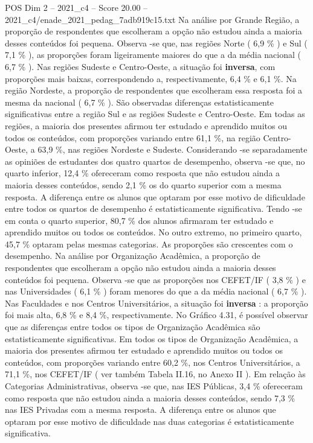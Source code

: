 \begin{textsample}{POS Dim 2 – 2021\_c4 – Score 20.00 – 2021\_c4/enade\_2021\_pedag\_7adb919c15.txt}
Na análise por Grande Região, a proporção de respondentes que escolheram a opção não estudou ainda a maioria desses conteúdos foi pequena.
Observa -se que, nas regiões Norte ( 6,9 \% ) e Sul ( 7,1 \% ), as proporções foram ligeiramente maiores do que a da média nacional ( 6,7 \% ).
Nas regiões Sudeste e Centro-Oeste, a situação foi \textbf{inversa}, com proporções mais baixas, correspondendo a, respectivamente, 6,4 \% e 6,1 \%.
Na região Nordeste, a proporção de respondentes que escolheram essa resposta foi a mesma da nacional ( 6,7 \% ).
São observadas diferenças estatisticamente significativas entre a região Sul e as regiões Sudeste e Centro-Oeste.
Em todas as regiões, a maioria dos presentes afirmou ter estudado e aprendido muitos ou todos os conteúdos, com proporções variando entre 61,1 \%, na região Centro-Oeste, a 63,9 \%, nas regiões Nordeste e Sudeste.
Considerando -se separadamente as opiniões de estudantes dos quatro quartos de desempenho, observa -se que, no quarto inferior, 12,4 \% ofereceram como resposta que não estudou ainda a maioria desses conteúdos, sendo 2,1 \% os do quarto superior com a mesma resposta.
A diferença entre os alunos que optaram por esse motivo de dificuldade entre todos os quartos de desempenho é estatisticamente significativa.
Tendo -se em conta o quarto superior, 80,7 \% dos alunos afirmaram ter estudado e aprendido muitos ou todos os conteúdos.
No outro extremo, no primeiro quarto, 45,7 \% optaram pelas mesmas categorias.
As proporções são crescentes com o desempenho.
Na análise por Organização Acadêmica, a proporção de respondentes que escolheram a opção não estudou ainda a maioria desses conteúdos foi pequena.
Observa -se que as proporções nos CEFET/IF ( 3,8 \% ) e nas Universidades ( 6,1 \% ) foram menores do que a da média nacional ( 6,7 \% ).
Nas Faculdades e nos Centros Universitários, a situação foi \textbf{inversa} : a proporção foi mais alta, 6,8 \% e 8,4 \%, respectivamente.
No Gráfico 4.31, é possível observar que as diferenças entre todos os tipos de Organização Acadêmica são estatisticamente significativas.
Em todos os tipos de Organização Acadêmica, a maioria dos presentes afirmou ter estudado e aprendido muitos ou todos os conteúdos, com proporções variando entre 60,2 \%, nos Centros Universitários, a 71,1 \%, nos CEFET/IF ( ver também Tabela II.16, no Anexo II ).
Em relação às Categorias Administrativas, observa -se que, nas IES Públicas, 3,4 \% ofereceram como resposta que não estudou ainda a maioria desses conteúdos, sendo 7,3 \% nas IES Privadas com a mesma resposta.
A diferença entre os alunos que optaram por esse motivo de dificuldade nas duas categorias é estatisticamente significativa.

\end{textsample}
